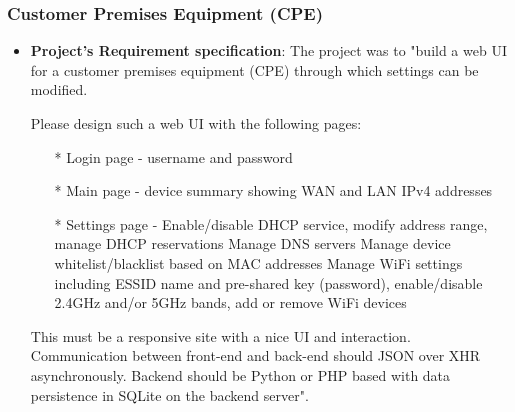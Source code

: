 \subsubsection{Customer Premises Equipment (CPE)}
\begin{itemize}
	\item \textbf{Project's Requirement specification}:
	The project was to "build a web UI for a customer premises equipment (CPE) through which settings can be modified.
	
	Please design such a web UI with the following pages:
	\begin{itemize}
		\item[*] Login page - username and password
		\item[*] Main page - device summary showing WAN and LAN IPv4 addresses
		\item[*] Settings page -
		\subitem Enable/disable DHCP service, modify address range, manage DHCP reservations
		\subitem Manage DNS servers
		\subitem Manage device whitelist/blacklist based on MAC addresses
		\subitem Manage WiFi settings including ESSID name and pre-shared key (password), enable/disable 2.4GHz and/or 5GHz bands, add or remove WiFi devices
	\end{itemize} 
	
	
	This must be a responsive site with a nice UI and interaction. Communication between front-end and back-end should JSON over XHR asynchronously. Backend should be Python or PHP based with data persistence in SQLite on the backend server".
\end{itemize}

